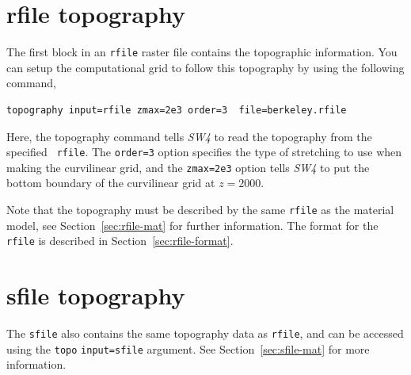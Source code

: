 \documentclass[11pt]{report}
\begin{document}

\section{rfile topography}\label{sec:topo-rfile}

The first block in an \verb+rfile+ raster file contains the topographic
information. You can setup the computational grid to follow this topography by using the following command,
\begin{verbatim}
topography input=rfile zmax=2e3 order=3  file=berkeley.rfile
\end{verbatim}
Here, the topography command tells \emph{SW4} to read the topography from the specified {\tt
  rfile}. The \verb+order=3+ option specifies the type of
stretching to use when making the curvilinear grid, and the \verb+zmax=2e3+ option tells \emph{SW4}
to put the bottom boundary of the curvilinear grid at $z=2000$. 

Note that the topography must be described by the same {\tt rfile} as the material model, see
Section~\ref{sec:rfile-mat} for further information. The format
for the \verb+rfile+ is described in Section~\ref{sec:rfile-format}. 

\section{sfile topography}\label{sec:topo-sfile}
The \verb+sfile+ also contains the same topography data as \verb+rfile+, and can be accessed using 
the \verb+topo+ \verb+input=sfile+ argument.
See Section~\ref{sec:sfile-mat} for more information.
\end{document}
